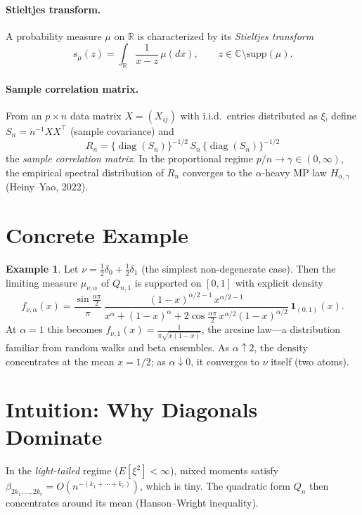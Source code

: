 \documentclass[11pt,a4paper]{article}
\theoremstyle{definition}
\newtheorem{example}[theorem]{Example}
\begin{document}
\paragraph{Stieltjes transform.}
A probability measure $\mu$ on $\mathbb{R}$ is characterized by its \emph{Stieltjes transform}
\[
  s_\mu(z)=\int_{\mathbb{R}}\frac{1}{x-z}\,\mu(dx),\qquad z\in\mathbb{C}\setminus\mathrm{supp}(\mu).
\]

\paragraph{Sample correlation matrix.}
From an $p\times n$ data matrix $X=(X_{ij})$ with i.i.d.\ entries distributed as $\xi$, define $S_n = n^{-1}XX^\top$ (sample covariance) and
\[
  R_n = \{\operatorname{diag}(S_n)\}^{-1/2}\,S_n\,\{\operatorname{diag}(S_n)\}^{-1/2}
\]
the \emph{sample correlation matrix}.  In the proportional regime $p/n\to\gamma\in(0,\infty)$, the empirical spectral distribution of $R_n$ converges to the $\alpha$-heavy MP law $H_{\alpha,\gamma}$ (Heiny--Yao, 2022).

\section{Concrete Example}

\begin{example}
Let $\nu=\tfrac12\delta_0+\tfrac12\delta_1$ (the simplest non-degenerate case).  Then the limiting measure $\mu_{\nu,\alpha}$ of $Q_{n,1}$ is supported on $[0,1]$ with explicit density
\[
  f_{\nu,\alpha}(x) = \frac{\sin\!\frac{\alpha\pi}{2}}{\pi}\,
    \frac{(1-x)^{\alpha/2-1}\,x^{\alpha/2-1}}
    {x^\alpha+(1-x)^\alpha+2\cos\!\frac{\alpha\pi}{2}\,x^{\alpha/2}(1-x)^{\alpha/2}}\,
    \mathbf{1}_{(0,1)}(x).
\]
At $\alpha=1$ this becomes
$f_{\nu,1}(x) = \frac{1}{\pi\sqrt{x(1-x)}}$,
the arcsine law---a distribution familiar from random walks and beta ensembles.  As $\alpha\uparrow 2$, the density concentrates at the mean $x=1/2$; as $\alpha\downarrow 0$, it converges to $\nu$ itself (two atoms).
\end{example}

\section{Intuition: Why Diagonals Dominate}

In the \emph{light-tailed} regime ($E[\xi^2]<\infty$), mixed moments satisfy $\beta_{2k_1,\dots,2k_r}=O(n^{-(k_1+\cdots+k_r)})$, which is tiny.  The quadratic form $Q_n$ then concentrates around its mean (Hanson--Wright inequality).
\end{document}
